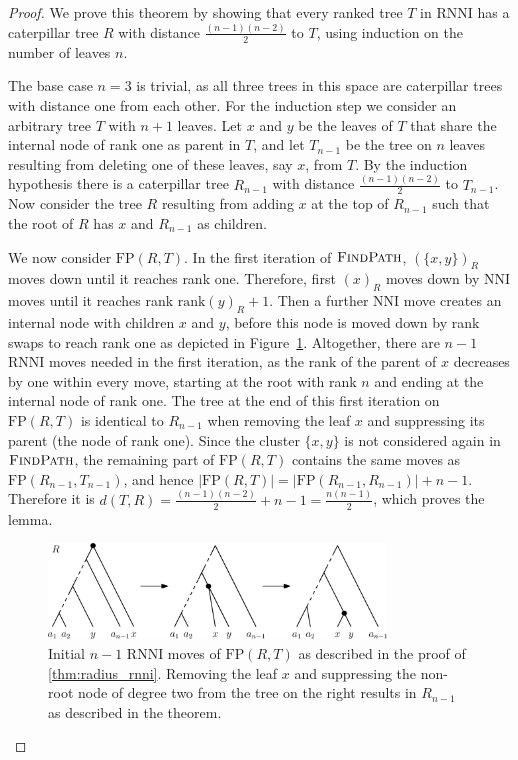 \documentclass[11pt]{amsart}
\newcommand{\rnni}{\mathrm{RNNI}}
\newcommand{\findpath}{\textsc{FindPath}}
\newcommand{\rank}{\mathrm{rank}}
\newcommand{\nni}{\mathrm{NNI}}
\newcommand{\fp}{\mathrm{FP}}
\begin{document}
\begin{proof}
	We prove this theorem by showing that every ranked tree $T$ in $\rnni$ has a caterpillar tree $R$ with distance $\frac{(n-1)(n-2)}{2}$ to $T$, using induction on the number of leaves $n$.

	The base case $n=3$ is trivial, as all three trees in this space are caterpillar trees with distance one from each other.
	For the induction step we consider an arbitrary tree $T$ with $n+1$ leaves.
	Let $x$ and $y$ be the leaves of $T$ that share the internal node of rank one as parent in $T$, and let $T_{n-1}$ be the tree on $n$ leaves resulting from deleting one of these leaves, say $x$, from $T$.
	By the induction hypothesis there is a caterpillar tree $R_{n-1}$ with distance $\frac{(n-1)(n-2)}{2}$ to $T_{n-1}$.
	Now consider the tree $R$ resulting from adding $x$ at the top of $R_{n-1}$ such that the root of $R$ has $x$ and $R_{n-1}$ as children.

	We now consider $\fp(R,T)$.
	In the first iteration of $\findpath$, $(\{x,y\})_R$ moves down until it reaches rank one.
	Therefore, first $(x)_R$ moves down by $\nni$ moves until it reaches rank $\rank(y)_R + 1$.
	Then a further $\nni$ move creates an internal node with children $x$ and $y$, before this node is moved down by rank swaps to reach rank one as depicted in Figure~\ref{fig:max_dist_ctree}.
	Altogether, there are $n-1$ $\rnni$ moves needed in the first iteration, as the rank of the parent of $x$ decreases by one within every move, starting at the root with rank $n$ and ending at the internal node of rank one.
	The tree at the end of this first iteration on $\fp(R,T)$ is identical to $R_{n-1}$ when removing the leaf $x$ and suppressing its parent (the node of rank one).
	Since the cluster $\{x,y\}$ is not considered again in $\findpath$, the remaining part of $\fp(R,T)$ contains the same moves as $\fp(R_{n-1},T_{n-1})$, and hence $|\fp(R,T)| = |\fp(R_{n-1},R_{n-1})| + n-1$.
	Therefore it is $d(T,R) = \frac{(n-1)(n-2)}{2} + n-1 = \frac{n(n-1)}{2}$, which proves the lemma.
	\begin{figure}[ht]
		\includegraphics[width=0.8\textwidth]{max_dist_ctree.eps}
		\caption{Initial $n - 1$ $\rnni$ moves of $\fp(R,T)$ as described in the proof of \autoref{thm:radius_rnni}.
		Removing the leaf $x$ and suppressing the non-root node of degree two from the tree on the right results in $R_{n-1}$ as described in the theorem.}
		\label{fig:max_dist_ctree}
	\end{figure}
\end{proof}
\end{document}
